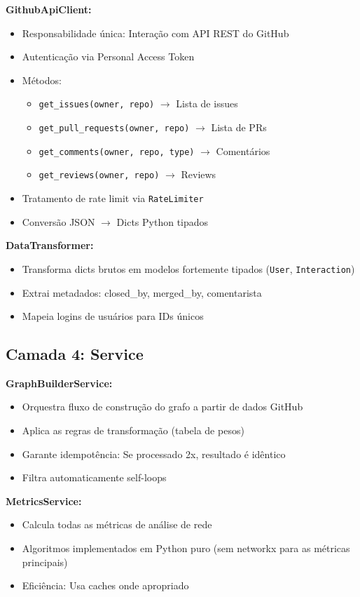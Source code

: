 \documentclass[12pt,a4paper]{article}
\begin{document}
\textbf{GithubApiClient:}
\begin{itemize}
  \item Responsabilidade única: Interação com API REST do GitHub
  \item Autenticação via Personal Access Token
  \item Métodos:
    \begin{itemize}
      \item \texttt{get\_issues(owner, repo)} $\to$ Lista de issues
      \item \texttt{get\_pull\_requests(owner, repo)} $\to$ Lista de PRs
      \item \texttt{get\_comments(owner, repo, type)} $\to$ Comentários
      \item \texttt{get\_reviews(owner, repo)} $\to$ Reviews
    \end{itemize}
  \item Tratamento de rate limit via \texttt{RateLimiter}
  \item Conversão JSON $\to$ Dicts Python tipados
\end{itemize}

\textbf{DataTransformer:}
\begin{itemize}
  \item Transforma dicts brutos em modelos fortemente tipados (\texttt{User}, \texttt{Interaction})
  \item Extrai metadados: closed\_by, merged\_by, comentarista
  \item Mapeia logins de usuários para IDs únicos
\end{itemize}

\subsection{Camada 4: Service}

\textbf{GraphBuilderService:}
\begin{itemize}
  \item Orquestra fluxo de construção do grafo a partir de dados GitHub
  \item Aplica as regras de transformação (tabela de pesos)
  \item Garante idempotência: Se processado 2x, resultado é idêntico
  \item Filtra automaticamente self-loops
\end{itemize}

\textbf{MetricsService:}
\begin{itemize}
  \item Calcula todas as métricas de análise de rede
  \item Algoritmos implementados em Python puro (sem networkx para as métricas principais)
  \item Eficiência: Usa caches onde apropriado
\end{itemize}
\end{document}
